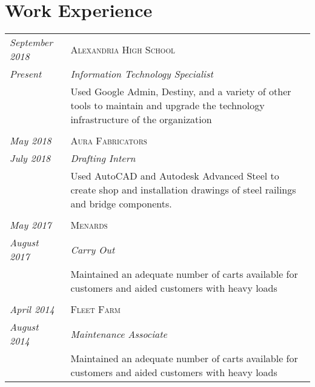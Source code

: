 \documentclass[letterpaper,10pt]{article}
\begin{document}
\section*{Work Experience}
	\begin{tabular}{R{3cm}|p{14cm}}
	\textsl{September 2018}	& \textsc{Alexandria High School}\\
	\textsl{Present}	& \emph{Information Technology Specialist}\\
	&\footnotesize{Used Google Admin, Destiny, and a variety of other tools to maintain and upgrade the technology infrastructure of the organization}\\
	\\
	\textsl{May 2018}   & \textsc{Aura Fabricators}\\
	\textsl{July 2018}  & \emph{Drafting Intern}\\
	&\footnotesize{Used AutoCAD and Autodesk Advanced Steel to create shop and installation drawings of steel railings and bridge components.}\\
	\\
	\textsl{May 2017}	  & \textsc{Menards}\\
	\textsl{August 2017}  & \emph{Carry Out}\\
	&\footnotesize{Maintained an adequate number of carts available for customers and aided customers with heavy loads}\\
	\\
	\textsl{April 2014}   & \textsc{Fleet Farm}\\
	\textsl{August 2014}  & \emph{Maintenance Associate}\\
	&\footnotesize{Maintained an adequate number of carts available for customers and aided customers with heavy loads}\\
	\end{tabular}
\end{document}
